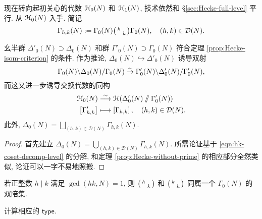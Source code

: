 现在转向起初关心的代数 $\EuScript{H}_0(N)$ 和 $\EuScript{H}_1(N)$, 技术依然和 \S\ref{sec:Hecke-full-level} 平行. 从 $\EuScript{H}_0(N)$ 入手. 简记
\begin{equation}\label{eqn:Gamma_hk-N}
	\Gamma_{h,k}(N) := \Gamma_0(N) \bigl(\begin{smallmatrix} h &  \\  & k \end{smallmatrix}\bigr) \Gamma_0(N), \quad (h,k) \in \mathcal{D}(N).
\end{equation}
\begin{theorem}\label{prop:Hecke-level-without-prime}
	幺半群 $\Delta'_0(N) \supset \Delta_0(N)$ 和群 $\Gamma'_0(N) \supset \Gamma_0(N)$ 符合定理 \ref{prop:Hecke-isom-criterion} 的条件. 作为推论, $\Delta_0(N) \hookrightarrow \Delta'_0(N)$ 诱导双射
	\[ \Gamma_0(N) \backslash \Delta_0(N) / \Gamma_0(N) \stackrel{\sim}{\rightarrow} \Gamma'_0(N) \backslash \Delta'_0(N) /\Gamma'_0(N), \]
	而这又进一步诱导交换代数的同构
	\begin{align*}
		\EuScript{H}_0(N) & \stackrel{\sim}{\longrightarrow} \EuScript{H}(\Delta'_0(N) \sslash \Gamma'_0(N)) \\
		\left[\Gamma'_{h,k}\right] & \longmapsto \left[\Gamma_{h,k}\right], \quad (h,k) \in \mathcal{D}(N). 
	\end{align*}
	此外, $\Delta_0(N) = \bigsqcup_{(h,k) \in \mathcal{D}(N)} \Gamma_{h,k}(N)$.
\end{theorem}
\begin{proof}
	首先建立 $\Delta_0(N) = \bigcup_{(h,k) \in \mathcal{D}(N)} \Gamma_{h,k}(N)$. 所需论证基于 \eqref{eqn:hk-coset-decomp-level} 的分解, 和定理 \ref{prop:Hecke-without-prime} 的相应部分全然类似, 论证可以一字不易地照搬.
\end{proof}

\begin{exercise}
	若正整数 $h \mid k$ 满足 $\gcd(hk,N)=1$, 则 $\bigl(\begin{smallmatrix} h &  \\  & k \end{smallmatrix}\bigr)$ 和 $\bigl(\begin{smallmatrix} k &  \\  & h \end{smallmatrix}\bigr)$ 同属一个 $\Gamma_0(N)$ 的双陪集.
	
	\begin{hint} 计算相应的 $\mathsf{type}$. \end{hint}
\end{exercise}

